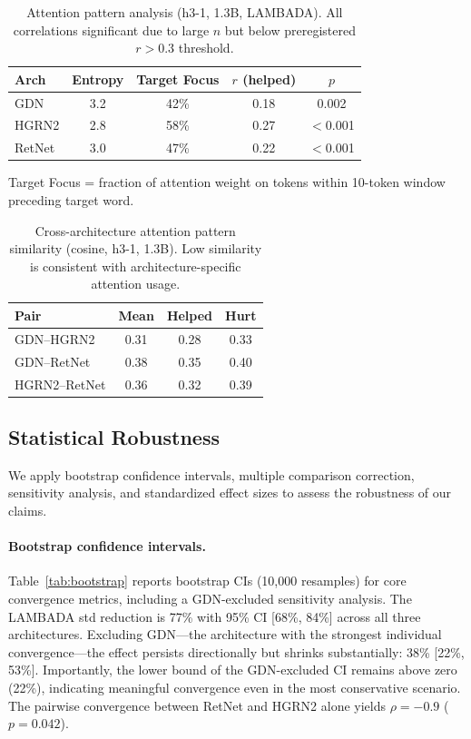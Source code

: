 \documentclass[11pt,a4paper]{article}
\begin{document}
\begin{table}[t]
\centering
\small
\caption{Attention pattern analysis (h3-1, 1.3B, LAMBADA). All correlations significant due to large $n$ but below preregistered $r{>}0.3$ threshold.}
\label{tab:attention}
\begin{tabular}{@{}lcccc@{}}
\toprule
Arch & Entropy & Target Focus & $r$ (helped) & $p$ \\
\midrule
GDN & 3.2 & 42\% & 0.18 & 0.002 \\
HGRN2 & 2.8 & 58\% & 0.27 & $<$0.001 \\
RetNet & 3.0 & 47\% & 0.22 & $<$0.001 \\
\bottomrule
\end{tabular}

\vspace{2pt}
{\footnotesize Target Focus = fraction of attention weight on tokens within 10-token window preceding target word.}
\end{table}

\begin{table}[t]
\centering
\small
\caption{Cross-architecture attention pattern similarity (cosine, h3-1, 1.3B). Low similarity is consistent with architecture-specific attention usage.}
\label{tab:attn-similarity}
\begin{tabular}{@{}lccc@{}}
\toprule
Pair & Mean & Helped & Hurt \\
\midrule
GDN--HGRN2 & 0.31 & 0.28 & 0.33 \\
GDN--RetNet & 0.38 & 0.35 & 0.40 \\
HGRN2--RetNet & 0.36 & 0.32 & 0.39 \\
\bottomrule
\end{tabular}
\end{table}

\subsection{Statistical Robustness}
\label{sec:robustness}

We apply bootstrap confidence intervals, multiple comparison correction, sensitivity analysis, and standardized effect sizes to assess the robustness of our claims.

\paragraph{Bootstrap confidence intervals.}
Table~\ref{tab:bootstrap} reports bootstrap CIs (10,000 resamples) for core convergence metrics, including a GDN-excluded sensitivity analysis. The LAMBADA std reduction is 77\% with 95\% CI [68\%, 84\%] across all three architectures. Excluding GDN---the architecture with the strongest individual convergence---the effect persists directionally but shrinks substantially: 38\% [22\%, 53\%]. Importantly, the lower bound of the GDN-excluded CI remains above zero (22\%), indicating meaningful convergence even in the most conservative scenario. The pairwise convergence between RetNet and HGRN2 alone yields $\rho{=}{-}0.9$ ($p{=}0.042$).
\end{document}
